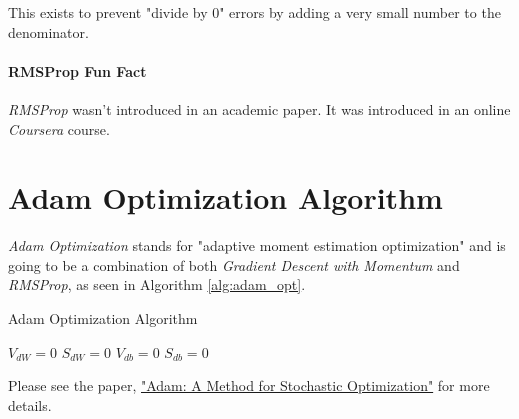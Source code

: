 \documentclass{article}
\begin{document}
This exists to prevent "divide by 0" errors by adding a very small number to the denominator.

\paragraph{RMSProp Fun Fact}

\textit{RMSProp} wasn't introduced in an academic paper.  It was introduced in an online \textit{Coursera} course.

\section{Adam Optimization Algorithm}

\textit{Adam Optimization} stands for "adaptive moment estimation optimization" and is going to be a combination of both \textit{Gradient Descent with Momentum} and \textit{RMSProp}, as seen in Algorithm \ref{alg:adam_opt}.

\begin{algorithm}[h]
\label{alg:adam_opt}
\caption{Adam Optimization Algorithm}
$V_{dW} = 0$ \;
$S_{dW} = 0$ \;
$V_{db} = 0$ \;
$S_{db} = 0$ \;

\end{algorithm}

Please see the paper, \href{https://arxiv.org/pdf/1412.6980.pdf}{"Adam: A Method for Stochastic Optimization"} for more details.
\end{document}
